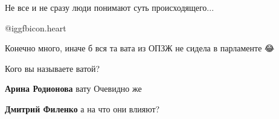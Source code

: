 \begin{itemize}
 
Не все и не сразу люди понимают суть происходящего...

 
@igg{fbicon.heart}

 
Конечно много, иначе б вся та вата из ОПЗЖ не сидела в парламенте 😂

\begin{itemize}
 
Кого вы называете ватой?

 
\textbf{Арина Родионова} вату \Smiley[1.0][yellow] Очевидно же \Smiley[1.0][yellow]

 
\textbf{Дмитрий Филенко} а на что они влияют?

 


\end{itemize}
\end{itemize}

